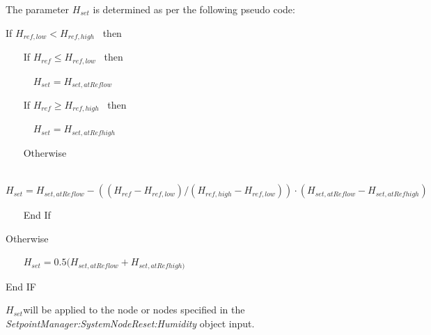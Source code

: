 The parameter \(H_{set}\) is determined as per the following pseudo code:

If \({H_{ref,low}} < {H_{ref,high}}\) ~then

~~~ If \({H_{ref}} \le {H_{ref,low}}\) ~then

~~~~~ \({H_{set}} = {H_{set,atReflow}}\)

~~~ If \({H_{ref}} \ge {H_{ref,high}}\) ~then

~~~~~ \({H_{set}} = {H_{set,atRefhigh}}\)

~~~ Otherwise

~~~~~ \({H_{set}} = {H_{set,atReflow}} - (({H_{ref}} - {H_{ref,low}})/({H_{ref,high}} - {H_{ref,low}}))\cdot ({H_{set,atReflow}} - {H_{set,atRefhigh}})\)

~~~ End If

Otherwise

~~~ \({H_{set}} = 0.5({H_{set,atReflow}} + {H_{set,atRefhigh)}}\)

End IF

\emph{\({H_{set}}\)}will be applied to the node or nodes specified in the \emph{SetpointManager:SystemNodeReset:Humidity} object input.

